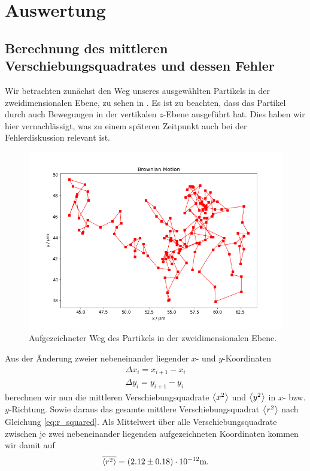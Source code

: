 \section{Auswertung}

\subsection{Berechnung des mittleren Verschiebungsquadrates und dessen Fehler}

Wir betrachten zunächst den Weg unseres ausgewählten Partikels in der zweidimensionalen Ebene, zu sehen in . Es ist zu beachten, dass das Partikel durch auch Bewegungen in der vertikalen $z$-Ebene ausgeführt hat. Dies haben wir hier vernachlässigt, was zu einem späteren Zeitpunkt auch bei der Fehlerdiskussion relevant ist.


\begin{figure}[H]
  \centering
  \includegraphics[width=.90\textwidth]{files/brown1.png}
  \caption{Aufgezeichneter Weg des Partikels in der zweidimensionalen Ebene.}
  \label{fig:brown1}
\end{figure}
Aus der Änderung zweier nebeneinander liegender $x$- und $y$-Koordinaten
\begin{gather}
  \Delta x_i = x_{i+1} - x_i\\
  \Delta y_i = y_{i+1} - y_i
\end{gather}
berechnen wir nun die mittleren Verschiebungsquadrate $\expval{x^2}$ und $\expval{y^2}$ in $x$- bzw. $y$-Richtung. Sowie daraus das gesamte mittlere Verschiebungsquadrat $\expval{r^2}$ nach Gleichung \eqref{eq:r_squared}. Als Mittelwert über alle Verschiebungsquadrate zwischen je zwei nebeneinander liegenden aufgezeichneten Koordinaten kommen wir damit auf
\begin{align}
  \overline{\expval{r^2}} = (2.12 \pm 0.18) \cdot 10^{-12} \si{\meter}.
\end{align}

